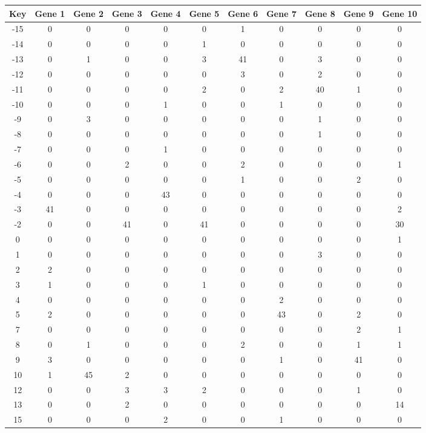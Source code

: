 \begin{tabular}{|c|c|c|c|c|c|c|c|c|c|c|}
\hline
Key & Gene 1 & Gene 2 & Gene 3 & Gene 4 & Gene 5 & Gene 6 & Gene 7 & Gene 8 & Gene 9 & Gene 10 \\
\hline
-15 & 0 & 0 & 0 & 0 & 0 & 1 & 0 & 0 & 0 & 0 \\
-14 & 0 & 0 & 0 & 0 & 1 & 0 & 0 & 0 & 0 & 0 \\
-13 & 0 & 1 & 0 & 0 & 3 & 41 & 0 & 3 & 0 & 0 \\
-12 & 0 & 0 & 0 & 0 & 0 & 3 & 0 & 2 & 0 & 0 \\
-11 & 0 & 0 & 0 & 0 & 2 & 0 & 2 & 40 & 1 & 0 \\
-10 & 0 & 0 & 0 & 1 & 0 & 0 & 1 & 0 & 0 & 0 \\
-9 & 0 & 3 & 0 & 0 & 0 & 0 & 0 & 1 & 0 & 0 \\
-8 & 0 & 0 & 0 & 0 & 0 & 0 & 0 & 1 & 0 & 0 \\
-7 & 0 & 0 & 0 & 1 & 0 & 0 & 0 & 0 & 0 & 0 \\
-6 & 0 & 0 & 2 & 0 & 0 & 2 & 0 & 0 & 0 & 1 \\
-5 & 0 & 0 & 0 & 0 & 0 & 1 & 0 & 0 & 2 & 0 \\
-4 & 0 & 0 & 0 & 43 & 0 & 0 & 0 & 0 & 0 & 0 \\
-3 & 41 & 0 & 0 & 0 & 0 & 0 & 0 & 0 & 0 & 2 \\
-2 & 0 & 0 & 41 & 0 & 41 & 0 & 0 & 0 & 0 & 30 \\
0 & 0 & 0 & 0 & 0 & 0 & 0 & 0 & 0 & 0 & 1 \\
1 & 0 & 0 & 0 & 0 & 0 & 0 & 0 & 3 & 0 & 0 \\
2 & 2 & 0 & 0 & 0 & 0 & 0 & 0 & 0 & 0 & 0 \\
3 & 1 & 0 & 0 & 0 & 1 & 0 & 0 & 0 & 0 & 0 \\
4 & 0 & 0 & 0 & 0 & 0 & 0 & 2 & 0 & 0 & 0 \\
5 & 2 & 0 & 0 & 0 & 0 & 0 & 43 & 0 & 2 & 0 \\
7 & 0 & 0 & 0 & 0 & 0 & 0 & 0 & 0 & 2 & 1 \\
8 & 0 & 1 & 0 & 0 & 0 & 2 & 0 & 0 & 1 & 1 \\
9 & 3 & 0 & 0 & 0 & 0 & 0 & 1 & 0 & 41 & 0 \\
10 & 1 & 45 & 2 & 0 & 0 & 0 & 0 & 0 & 0 & 0 \\
12 & 0 & 0 & 3 & 3 & 2 & 0 & 0 & 0 & 1 & 0 \\
13 & 0 & 0 & 2 & 0 & 0 & 0 & 0 & 0 & 0 & 14 \\
15 & 0 & 0 & 0 & 2 & 0 & 0 & 1 & 0 & 0 & 0 \\
\hline
\end{tabular}